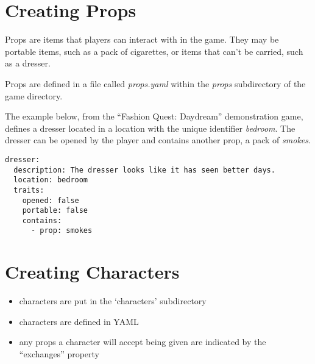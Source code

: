 \documentclass[letterpaper,10pt,english]{manual}
\begin{document}
\section{Creating Props}

Props are items that players can interact with in the game. They may be portable items, such as a pack of cigarettes, or items that can't be carried, such as a dresser.

Props are defined in a file called \emph{props.yaml} within the \emph{props} subdirectory of the game directory.

The example below, from the ``Fashion Quest: Daydream'' demonstration game, defines a dresser located in a location with the unique identifier \emph{bedroom}. The dresser can be opened by the player and contains another prop, a pack of \emph{smokes}.

\begin{Verbatim}[commandchars=@\[\]]
dresser:
  description: The dresser looks like it has seen better days.
  location: bedroom
  traits:
    opened: false
    portable: false
    contains:
      - prop: smokes
\end{Verbatim}


\section{Creating Characters}
\begin{itemize}
\item {} 
characters are put in the `characters' subdirectory

\item {} 
characters are defined in YAML

\item {} 
any props a character will accept being given are indicated by the ``exchanges'' property

\end{itemize}
\end{document}
